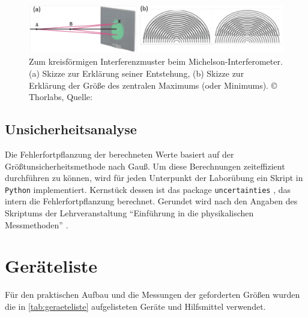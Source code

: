 \documentclass[ngerman]{scrartcl}
\begin{document}
\begin{figure}[H]
    \centering
    \begin{samepage}
        \includegraphics[width=\linewidth]{fig/Compressed/Angabe_Abb9.png}
        \caption[Interferenzmuster Michelson-Interferometer]{Zum kreisförmigen Interferenzmuster beim Michelson-Interferometer. (a) Skizze zur Erklärung seiner Entstehung, (b) Skizze zur Erklärung der Größe des zentralen Maximums (oder Minimums). \copyright{} Thorlabs, Quelle: \cite{ref:angabe}}
        \label{fig:interferenzmuster_michelson_interferometer}
    \end{samepage}
\end{figure}

\subsection{Unsicherheitsanalyse}
\label{subsec:unsicherheitsanalyse}

Die Fehlerfortpflanzung der berechneten Werte basiert auf der Größtunsicherheitsmethode nach Gauß. Um diese Berechnungen zeiteffizient durchführen zu können, wird für jeden Unterpunkt der Laborübung ein Skript in \verb!Python! implementiert. Kernstück dessen ist das package \verb!uncertainties! \cite{ref:uncertainties}, das intern die Fehlerfortpflanzung berechnet. Gerundet wird nach den Angaben des Skriptums der Lehrveranstaltung \enquote{Einführung in die physikalischen Messmethoden} \cite{ref:messmethoden}.



\section{Geräteliste}
\label{sec:geraeteliste}

Für den praktischen Aufbau und die Messungen der geforderten Größen wurden die in \autoref{tab:geraeteliste} aufgelisteten Geräte und Hilfsmittel verwendet.
\end{document}
